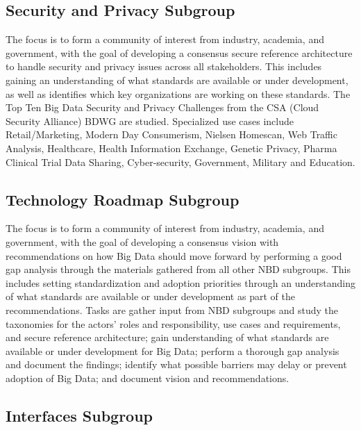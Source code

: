 \subsection{Security and Privacy Subgroup}

The focus is to form a community of interest from industry, academia,
and government, with the goal of developing a consensus secure reference
architecture to handle security and privacy issues across all
stakeholders. This includes gaining an understanding of what standards
are available or under development, as well as identifies which key
organizations are working on these standards. The Top Ten Big Data
Security and Privacy Challenges from the CSA (Cloud Security Alliance)
BDWG are studied. Specialized use cases include Retail/Marketing, Modern
Day Consumerism, Nielsen Homescan, Web Traffic Analysis, Healthcare,
Health Information Exchange, Genetic Privacy, Pharma Clinical Trial Data
Sharing, Cyber-security, Government, Military and Education.




\subsection{Technology Roadmap Subgroup}

The focus is to form a community of interest from industry, academia,
and government, with the goal of developing a consensus vision with
recommendations on how Big Data should move forward by performing a good
gap analysis through the materials gathered from all other NBD
subgroups. This includes setting standardization and adoption priorities
through an understanding of what standards are available or under
development as part of the recommendations. Tasks are gather input from
NBD subgroups and study the taxonomies for the actors' roles and
responsibility, use cases and requirements, and secure reference
architecture; gain understanding of what standards are available or
under development for Big Data; perform a thorough gap analysis and
document the findings; identify what possible barriers may delay or
prevent adoption of Big Data; and document vision and recommendations.




\subsection{Interfaces Subgroup}

